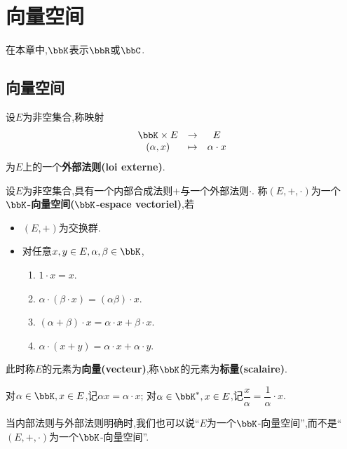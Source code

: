 \chapter{向量空间}

在本章中,$\bbK$表示$\bbR$或$\bbC$.

\section{向量空间}

\begin{deff}
    设$E$为非空集合,称映射$$\begin{array}[t]{ccc} \bbK \times E & \to & E \\ (\alpha, x) & \tp &
    \alpha \cdot x \end{array}$$为$E$上的一个\textbf{外部法则(loi externe)}.
\end{deff}

\begin{deff}
    设$E$为非空集合,具有一个内部合成法则$+$与一个外部法则$\cdot$.
    称$(E, +, \cdot)$为一个\textbf{$\boldsymbol{\bbK}$-向量空间($\boldsymbol{\bbK}$-espace vectoriel)},若

    \begin{itemize}
        \item $(E, +)$为交换群.
        \item 对任意$x, y \in E, \alpha, \beta \in \bbK$,
            \begin{enumerate}
                \item $1 \cdot x = x$.
                \item $\alpha \cdot (\beta \cdot x) = (\alpha \beta) \cdot x$.
                \item $(\alpha + \beta) \cdot x = \alpha \cdot x + \beta \cdot x$.
                \item $\alpha \cdot (x + y) = \alpha \cdot x + \alpha \cdot y$.
            \end{enumerate}
    \end{itemize}

    此时称$E$的元素为\textbf{向量(vecteur)},称$\bbK$的元素为\textbf{标量(scalaire)}.
\end{deff}

\begin{rqq}
    对$\alpha \in \bbK, x \in E$,记$\alpha x = \alpha \cdot x$;
    对$\alpha \in \bbK^*, x \in E$,记$\dfrac{x}{\alpha} = \dfrac{1}{\alpha} \cdot x$.
\end{rqq}

\begin{rqq}
    当内部法则与外部法则明确时,我们也可以说``$E$为一个$\bbK$-向量空间'',而不是``$(E, +, \cdot)$为一个$\bbK$-向量空间''.
\end{rqq}

